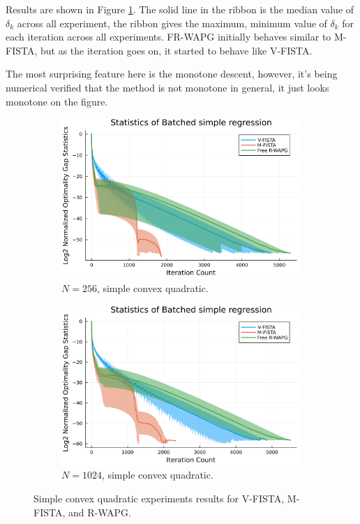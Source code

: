 \documentclass[12pt]{article}
\begin{document}
            Results are shown in Figure \ref{fig:simple-quadratic-NOG}.
            The solid line in the ribbon is the median value of $\delta_k$ across all experiment, the ribbon gives the maximum, minimum value of $\delta_k$ for each iteration across all experiments. 
            FR-WAPG initially behaves similar to M-FISTA, but as the iteration goes on, it started to behave like V-FISTA.  
            \par 
            The most surprising feature here is the monotone descent, however, it's being numerical verified that the method is not monotone in general, it just looks monotone on the figure. 
            \begin{figure}[H]
                \begin{subfigure}[b]{0.47\textwidth}
                    \centering
                    \includegraphics[width=\textwidth]{assets/simple_regression_batched-256.png}
                    \caption{$N = 256$, simple convex quadratic.}
                \end{subfigure}
                \hfill
                \begin{subfigure}[b]{0.47\textwidth}
                    \centering
                    \includegraphics[width=\textwidth]{assets/simple_regression_batched-1024.png}
                    \caption{$N = 1024$, simple convex quadratic. }
                \end{subfigure}
                \caption{Simple convex quadratic experiments results for V-FISTA, M-FISTA, and R-WAPG. }
                \label{fig:simple-quadratic-NOG}
            \end{figure}
\end{document}
